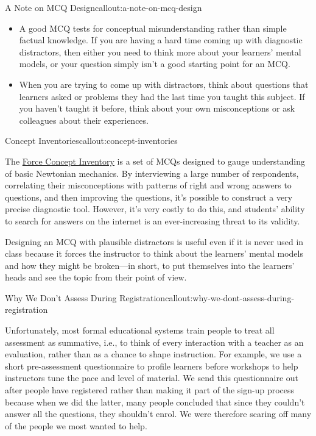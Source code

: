 \begin{callout}{A Note on MCQ Design}{callout:a-note-on-mcq-design}

\begin{itemize}

\item
  A good MCQ tests for conceptual misunderstanding rather than simple
  factual knowledge. If you are having a hard time coming up with
  diagnostic distractors, then either you need to think more about your
  learners' mental models, or your question simply isn't a good starting
  point for an MCQ.

\item
  When you are trying to come up with distractors, think about questions
  that learners asked or problems they had the last time you taught this
  subject. If you haven't taught it before, think about your own
  misconceptions or ask colleagues about their experiences.

\end{itemize}

\end{callout}

\begin{callout}{Concept Inventories}{callout:concept-inventories}

The \href{https://en.wikipedia.org/wiki/Force\_Concept\_Inventory}{Force
Concept Inventory} is a set of MCQs designed to gauge understanding of
basic Newtonian mechanics. By interviewing a large number of
respondents, correlating their misconceptions with patterns of right and
wrong answers to questions, and then improving the questions, it's
possible to construct a very precise diagnostic tool. However, it's very
costly to do this, and students' ability to search for answers on the
internet is an ever-increasing threat to its validity.

\end{callout}

Designing an MCQ with plausible distractors is useful even if it is
never used in class because it forces the instructor to think about
the learners' mental models and how they might be broken---in short,
to put themselves into the learners' heads and see the topic from
their point of view.

\begin{callout}{Why We Don't Assess During Registration}{callout:why-we-dont-assess-during-registration}

Unfortunately, most formal educational systems train people to treat all
assessment as summative, i.e., to think of every interaction with a
teacher as an evaluation, rather than as a chance to shape instruction.
For example, we use a short pre-assessment questionnaire to profile
learners before workshops to help instructors tune the pace and level of
material. We send this questionnaire out after people have registered
rather than making it part of the sign-up process because when we did
the latter, many people concluded that since they couldn't answer all
the questions, they shouldn't enrol. We were therefore scaring off many
of the people we most wanted to help.

\end{callout}

